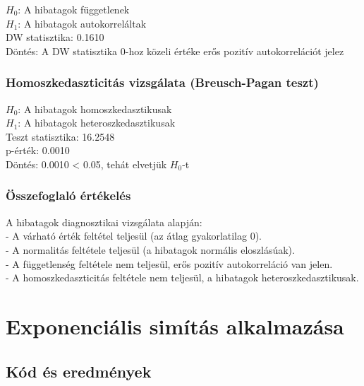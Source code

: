 \documentclass[11pt]{article}
\begin{document}
$H_0$: A hibatagok függetlenek\\
$H_1$: A hibatagok autokorreláltak\\
DW statisztika: 0.1610\\
Döntés: A DW statisztika 0-hoz közeli értéke erős pozitív
autokorrelációt jelez

\subsubsection{Homoszkedaszticitás vizsgálata (Breusch-Pagan
teszt)}\label{homoszkedaszticituxe1s-vizsguxe1lata-breusch-pagan-teszt}

$H_0$: A hibatagok homoszkedasztikusak\\
$H_1$: A hibatagok heteroszkedasztikusak\\
Teszt statisztika: 16.2548\\
p-érték: 0.0010\\
Döntés: 0.0010 \textless{} 0.05, tehát elvetjük $H_0$-t

\subsubsection{Összefoglaló
értékelés}\label{uxf6sszefoglaluxf3-uxe9rtuxe9keluxe9s}

A hibatagok diagnosztikai vizsgálata alapján:\\
- A várható érték feltétel teljesül (az átlag gyakorlatilag 0).\\
- A normalitás feltétele teljesül (a hibatagok normális eloszlásúak).\\
- A függetlenség feltétele nem teljesül, erős pozitív autokorreláció van
jelen.\\
- A homoszkedaszticitás feltétele nem teljesül, a hibatagok
heteroszkedasztikusak.

    \section{Exponenciális simítás
alkalmazása}\label{exponenciuxe1lis-simuxedtuxe1s-alkalmazuxe1sa}

\subsection{Kód és eredmények}\label{kuxf3d-uxe9s-eredmuxe9nyek}
\end{document}
